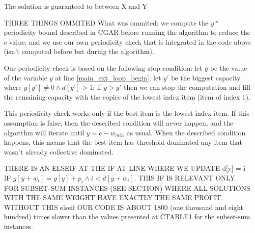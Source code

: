 \documentclass[runningheads,a4paper]{llncs}
\begin{document}
The solution is guaranteed to between X and Y


THREE THINGS OMMITED
What was ommited: we compute the \(y*\) periodicity bound described in CGAR before running the algorithm to reduce the \(c\) value; and we use our own periodicity check that is integrated in the code above (isn't computed before but during the algorithm).

Our periodicity check is based on the following stop condition: let \(y\) be the value of the variable \(y\) at line \ref{main_ext_loop_begin}; let \(y'\) be the biggest capacity where \(g[y'] \neq 0 \land d[y'] > 1\); if \(y > y'\) then we can stop the computation and fill the remaining capacity with the copies of the lowest index item (item of index \(1\)).%


This periodicity check works only if the best item is the lowest index item. If this assumption is false, then the described condition will never happen, and the algorithm will iterate until \(y = c - w_{min}\) as usual. When the described condition happens, this means that the best item has threshold dominated any item that wasn't already collective dominated.

THERE IS AN ELSEIF AT THE IF AT LINE WHERE WE UPDATE d[y] = i IF \(g[y + w_i] = g[y] + p_i \land i < d[y + w_i]\). THIS IF IS RELEVANT ONLY FOR SUBSET-SUM INSTANCES (SEE SECTION) WHERE ALL SOLUTIONS WITH THE SAME WEIGHT HAVE EXACTLY THE SAME PROFIT. WITHOUT THIS elseif OUR CODE IS ABOUT 1800 (one thousand and eight hundred) times slower than the values presented at CTABLE1 for the subset-sum instances.
\end{document}

